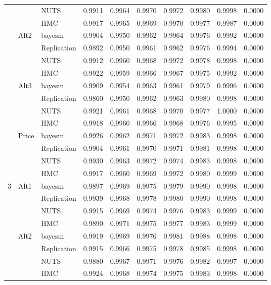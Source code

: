 \begin{longtable}{cllccccccc}
 &  & NUTS & 0.9911 & 0.9964 & 0.9970 & 0.9972 & 0.9980 & 0.9998 & 0.0000 \\
 &  & HMC & 0.9917 & 0.9965 & 0.9969 & 0.9970 & 0.9977 & 0.9987 & 0.0000 \\
 & Alt2 & bayesm & 0.9904 & 0.9950 & 0.9962 & 0.9964 & 0.9976 & 0.9992 & 0.0000 \\
 &  & Replication & 0.9892 & 0.9950 & 0.9961 & 0.9962 & 0.9976 & 0.9994 & 0.0000 \\
 &  & NUTS & 0.9912 & 0.9960 & 0.9968 & 0.9972 & 0.9978 & 0.9998 & 0.0000 \\
 &  & HMC & 0.9922 & 0.9959 & 0.9966 & 0.9967 & 0.9975 & 0.9992 & 0.0000 \\
 & Alt3 & bayesm & 0.9909 & 0.9954 & 0.9963 & 0.9961 & 0.9979 & 0.9996 & 0.0000 \\
 &  & Replication & 0.9860 & 0.9950 & 0.9962 & 0.9963 & 0.9980 & 0.9998 & 0.0000 \\
 &  & NUTS & 0.9921 & 0.9961 & 0.9968 & 0.9970 & 0.9977 & 1.0000 & 0.0000 \\
 &  & HMC & 0.9918 & 0.9960 & 0.9966 & 0.9968 & 0.9976 & 0.9995 & 0.0000 \\
 & Price & bayesm & 0.9926 & 0.9962 & 0.9971 & 0.9972 & 0.9983 & 0.9998 & 0.0000 \\
 &  & Replication & 0.9904 & 0.9961 & 0.9970 & 0.9971 & 0.9981 & 0.9998 & 0.0000 \\
 &  & NUTS & 0.9930 & 0.9963 & 0.9972 & 0.9974 & 0.9983 & 0.9998 & 0.0000 \\
 &  & HMC & 0.9917 & 0.9960 & 0.9969 & 0.9972 & 0.9980 & 0.9999 & 0.0000 \\
3 & Alt1 & bayesm & 0.9897 & 0.9969 & 0.9975 & 0.9979 & 0.9990 & 0.9998 & 0.0000 \\
 &  & Replication & 0.9939 & 0.9968 & 0.9978 & 0.9980 & 0.9990 & 0.9998 & 0.0000 \\
 &  & NUTS & 0.9915 & 0.9969 & 0.9974 & 0.9976 & 0.9983 & 0.9999 & 0.0000 \\
 &  & HMC & 0.9890 & 0.9971 & 0.9975 & 0.9977 & 0.9983 & 0.9999 & 0.0000 \\
 & Alt2 & bayesm & 0.9919 & 0.9969 & 0.9976 & 0.9981 & 0.9988 & 0.9998 & 0.0000 \\
 &  & Replication & 0.9915 & 0.9966 & 0.9975 & 0.9978 & 0.9985 & 0.9998 & 0.0000 \\
 &  & NUTS & 0.9880 & 0.9967 & 0.9971 & 0.9976 & 0.9982 & 0.9997 & 0.0000 \\
 &  & HMC & 0.9924 & 0.9968 & 0.9974 & 0.9975 & 0.9983 & 0.9998 & 0.0000 \\

\end{longtable}
